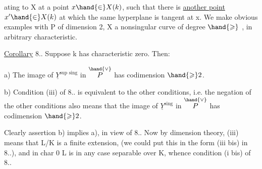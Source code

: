
ating to X at a point $x\hand{\in} X(k)$,  such that there is \uline{another point}
$x'\hand{\in} X(k)$ at which the same hyperplane is tangent at x. We make
obvious examples with  P of dimension 2, X a nonsingular
curve of degree $\hand{\geqslant}$ , in arbitrary characteristic. 

\uline{Corollary} 8.. Suppose k has characteristic zero. Then:

a) The image of $\underline{Y}^{\text{sup sing}}$ in $\overset{\hand{\vee}}{P}$ has codimension $\hand{\geqslant} 2$.

b) Condition (iii) of 8.. is equivalent to the other conditions, i.e.
the negation of the other conditions\hand{,}  also means that the image of $\underline{Y}^{\text{sing}}$
in $\overset{\hand{\vee}}{P}$ has codimension $\hand{\geqslant} 2$.

Clearly assertion b) implies a), in view of 8.. Now
by dimension theory, (iii) means that L/K is a finite extension,
 (we could put this in the form (iii bis) in 8..),
and in char 0  L is in any case separable over K, whence
condition (i bis) of 8..

